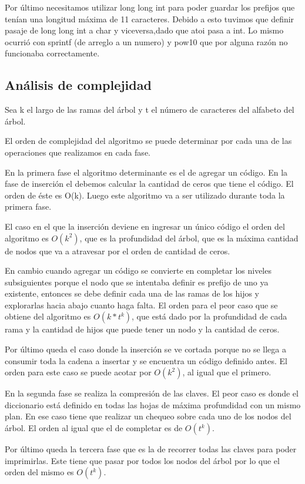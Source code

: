 Por último necesitamos utilizar long long int para poder guardar los prefijos que tenían una longitud máxima de 11 caracteres.
Debido a esto tuvimos que definir pasaje de long long int a char y viceversa,dado que atoi pasa a int. 
Lo mismo ocurrió con sprintf (de arreglo a un numero) y pow10 que por alguna razón no funcionaba correctamente. 

\subsection*{Análisis de complejidad}

Sea k el largo de las ramas del árbol y t el número de caracteres del alfabeto del árbol.


El orden de complejidad del algoritmo se puede determinar por cada una de las operaciones que realizamos
en cada fase. 

En la primera fase el algoritmo determinante es el de agregar un código. 
En la fase de inserción el debemos calcular la cantidad de ceros que tiene el código. 
El orden de éste es O(k). Luego este algoritmo va a ser utilizado durante toda la primera fase.

El caso en el que la inserción deviene en ingresar un único código el
orden del algoritmo es $O(k^2)$, que es la profundidad del árbol, que es la
máxima cantidad de nodos que va a atravesar por el orden de cantidad de ceros.

En cambio cuando agregar un código se convierte en completar los niveles
subsiguientes porque el nodo que se intentaba definir es prefijo de uno ya
existente, entonces se debe definir cada una de las ramas de los hijos y
explorarlas hacia abajo cuanto haga falta. El orden para el peor caso que se
obtiene del algoritmo es $O(k*t^k)$, que está dado por la profundidad de cada
rama y la cantidad de hijos que puede tener un nodo y la cantidad de ceros.

Por último queda el caso donde la inserción se ve cortada porque no
se llega a consumir toda la cadena a insertar y se encuentra un código
definido antes. El orden para este caso se puede acotar por $O(k^2)$, al igual
que el primero.

En la segunda fase se realiza la compresión de las claves. El peor caso es
donde el diccionario está definido en todas las hojas de máxima profundidad
con un mismo plan. En ese caso tiene que realizar un chequeo sobre cada uno
de los nodos del árbol. El orden al igual que el de completar es de $O(t^k)$.

Por último queda la tercera fase que es la de recorrer todas las claves para
poder imprimirlas. Este tiene que pasar por todos los nodos del árbol por lo que
el orden del mismo es $O(t^k)$.
